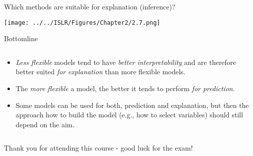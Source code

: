 \documentclass[10pt,ignorenonframetext,]{beamer}
\providecommand{\tightlist}{%
  \setlength{\itemsep}{0pt}\setlength{\parskip}{0pt}}
\begin{document}
\begin{frame}

Which methods are suitable for explanation (inference)? \vspace{-2mm}

\centering

\texttt{[image: ../../ISLR/Figures/Chapter2/2.7.png]}

\end{frame}

\begin{frame}

\begin{block}{Bottomline}

\(~\)

\begin{itemize}
\tightlist
\item
  \emph{Less flexible} models tend to have \emph{better
  interpretability} and are therefore better suited \emph{for
  explanation} than more flexible models.
\end{itemize}

\vspace{2mm}

\begin{itemize}
\tightlist
\item
  The \emph{more flexible} a model, the better it tends to perform
  \emph{for prediction}.
\end{itemize}

\vspace{2mm}

\begin{itemize}
\tightlist
\item
  Some models can be used for both, prediction and explanation, but then
  the approach how to build the model (e.g., how to select variables)
  should still depend on the aim.
\end{itemize}

\end{block}

\end{frame}

\begin{frame}

\(~\)

Thank you for attending this course - good luck for the exam!

\end{frame}
\end{document}
